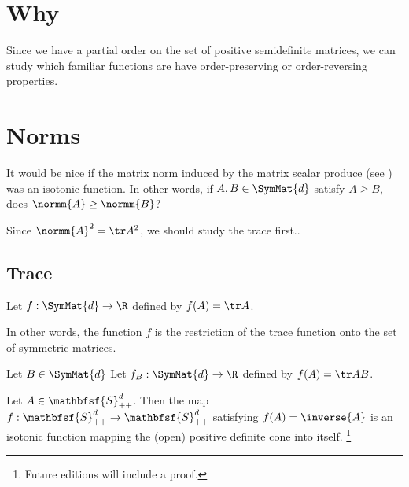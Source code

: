 
\section*{Why}

Since we have a partial order on the set of positive semidefinite matrices, we can study which familiar functions are have order-preserving or order-reversing properties.

\section*{Norms}

It would be nice if the matrix norm induced by the matrix scalar produce (see ) was an isotonic function.
In other words, if $A, B \in \SymMat{d}$ satisfy $A \geq B$, does $\normm{A} \geq \normm{B}$?

Since $\normm{A}^2 = \tr A^2$, we should study the trace first..

\subsection*{Trace}

\begin{proposition}
Let $f: \SymMat{d} \to \R $ defined by $f(A) = \tr A$.
\end{proposition}

In other words, the function $f$ is the restriction of the trace function onto the set of symmetric matrices.

\begin{proposition}
Let $B \in \SymMat{d}$
Let $f_B: \SymMat{d} \to \R $ defined by $f(A) = \tr AB$.
\end{proposition}


\begin{proposition}
Let $A \in \mathbfsf{S} _{++}^d$.
Then the map $f: \mathbfsf{S} _{++}^d \to \mathbfsf{S} _{++}^d$ satisfying $f(A) = \inverse{A}$ is an isotonic function mapping the (open) positive definite cone into itself.
  \ifhmode\unskip\fi\footnote{
Future editions will include a proof.
  }
\end{proposition}

\blankpage